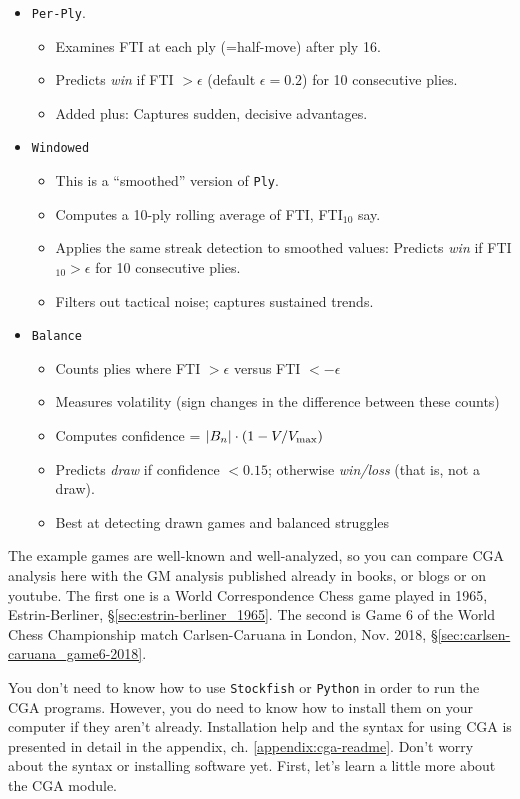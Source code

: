 \documentclass[12pt]{book}
\begin{document}
\begin{itemize}
\item
  {\tt Per-Ply}.
 \begin{itemize}
 \item
  Examines FTI at each ply (=half-move) after ply 16.
 \item
   Predicts {\it win} if FTI $> \epsilon$ (default $\epsilon = 0.2$)
   for 10 consecutive plies.
 \item
  Added plus: Captures sudden, decisive advantages.
 \end{itemize}
\item
  {\tt Windowed}
 \begin{itemize}
 \item
 This is a ``smoothed'' version of {\tt Ply}.
 \item
  Computes a 10-ply rolling average of FTI, FTI$_{10}$ say.
 \item
   Applies the same streak detection to smoothed values:
   Predicts {\it win} if FTI$_{10} > \epsilon$ 
   for 10 consecutive plies.
 \item
  Filters out tactical noise; captures sustained trends.
 \end{itemize}
\item
  {\tt Balance} 
 \begin{itemize}
 \item
 Counts plies where FTI $> \epsilon$ versus FTI $<- \epsilon$
 \item
 Measures volatility (sign changes in the difference between these counts)
 \item
   Computes confidence = $|B_n|\cdot (1 - V/V_{\rm max})$
\item   
  Predicts {\it draw} if confidence $<0.15$; otherwise {\it win/loss}
  (that is, not a draw).
\item
  Best at detecting drawn games and balanced struggles
 \end{itemize}
 \end{itemize}

The example games are well-known and well-analyzed, so you can
compare CGA analysis here with the GM analysis published already
in books, or blogs or on youtube.
The first one is a World Correspondence Chess game played in 1965,
Estrin-Berliner, \S \ref{sec:estrin-berliner_1965}.
The second is Game 6 of the World Chess Championship match
Carlsen-Caruana in London, Nov. 2018, \S \ref{sec:carlsen-caruana_game6-2018}.

You don't need to know how to use {\tt Stockfish} or {\tt Python}
in order to run the CGA programs. However, you do need to know how to
install them on your computer if they aren't already.
Installation help and the syntax for using CGA is presented
in detail in the appendix,
ch. \ref{appendix:cga-readme}. Don't worry about the syntax or
installing software yet. First, let's learn a little more
about the CGA module.
\end{document}
